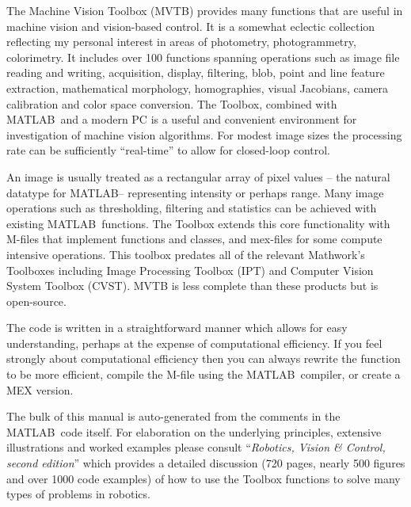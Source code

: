 \documentclass[a4paper,twoside]{report}
\def\Mlab{MATLAB}
\begin{document}
The Machine Vision Toolbox (MVTB) provides many 
functions that 
are useful in machine vision and vision-based control.
It is a somewhat eclectic collection reflecting my personal interest in
areas of photometry, photogrammetry, colorimetry.
It includes over 100 functions spanning operations such as
image file reading and writing, acquisition, display, filtering,
blob, point and line feature extraction,  mathematical morphology, 
homographies, visual Jacobians,
camera calibration and color space conversion.
The Toolbox, combined with \Mlab\ and a modern PC
is a useful and convenient environment for investigation of machine
vision algorithms.  For modest image sizes the processing rate can
be sufficiently ``real-time'' to allow for closed-loop control.  

An image is usually treated as a rectangular array of pixel values -- the natural datatype for \Mlab -- representing
intensity or perhaps range.
Many image operations such as thresholding, filtering and statistics can
be achieved with existing \Mlab\ functions.
The Toolbox extends this core functionality with M-files that
implement functions and classes, and mex-files for some compute
intensive operations.
This toolbox predates all of the relevant Mathwork's Toolboxes including Image Processing 
Toolbox\textsuperscript{\textregistered} (IPT) and Computer Vision System Toolbox\textsuperscript{\textregistered} (CVST).
MVTB is less complete than these products but  is open-source.

The code is written in a straightforward manner which allows
for easy understanding, perhaps at the expense of computational efficiency.
If you feel strongly about computational efficiency then you can always
rewrite the function to be more efficient,
compile the M-file using the \Mlab\   compiler, or
create a MEX version.

The bulk of this manual is auto-generated from the comments in the \Mlab\ code itself.
For elaboration on the underlying principles, extensive illustrations and worked examples please consult
 ``\textit{Robotics, Vision \& Control, second edition}''  which provides a detailed discussion (720 pages, nearly 500 figures and over 1000 code examples) of how to use the Toolbox functions to solve many types of problems in robotics.
\end{document}
